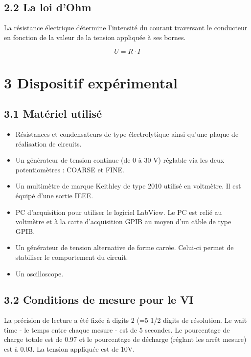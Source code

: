 \documentclass{report}
\begin{document}
\subsection*{2.2 La loi d'Ohm}
\hspace*{0.5cm}
La r\'esistance \'electrique d\'etermine l'intensit\'e du courant traversant le conducteur en fonction de la valeur de la tension appliqu\'ee \`a ses bornes.

\begin{equation}
    U = R \cdot I
\end{equation}


\section*{3 Dispositif exp\'erimental}
\subsection*{3.1 Mat\'eriel utilis\'e}
\begin{itemize}
\item R\'esistances et condensateurs de type \'electrolytique  ainsi qu'une plaque de r\'ealisation de circuits.

\item Un g\'en\'erateur de tension continue (de 0 \`a 30 V) r\'eglable via les deux potentiom\`etres : COARSE et FINE.

\item Un multim\`etre de marque Keithley de type 2010 utilis\'e en voltm\`etre. Il est \'equip\'e d'une sortie IEEE.

\item PC d'acquisition pour utiliser le logiciel LabView. Le PC est reli\'e au voltm\`etre et \`a la carte d'acquisition GPIB au moyen d'un c\^able de type GPIB.

\item Un g\'en\'erateur de tension alternative de forme carr\'ee. Celui-ci permet de stabiliser le comportement du circuit.

\item Un oscilloscope.
\end{itemize}

\subsection*{3.2 Conditions de mesure pour le VI}
\hspace*{0.5cm}
La pr\'ecision de lecture a \'et\'e fix\'ee \`a digits 2 (=5 1/2 digits de r\'esolution. Le wait time - le temps entre chaque mesure - est de 5 secondes. Le pourcentage de charge totale est de 0.97 et le pourcentage de d\'echarge (r\'eglant les arr\^et mesure) est \`a 0.03. La tension appliqu\'ee est de 10V.
\pagebreak
\end{document}
